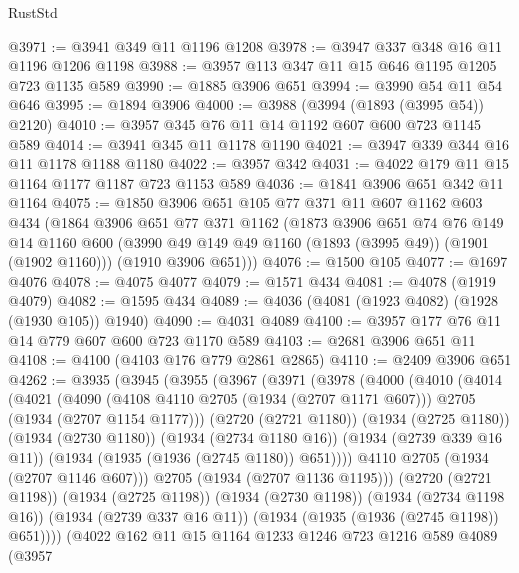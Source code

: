 \begin{lexlean}{RustStd}
\begin{coremodule}
@3971 := @3941 @349 @11 @1196 @1208
@3978 := @3947 @337 @348 @16 @11 @1196 @1206 @1198
@3988 := @3957 @113 @347 @11 @15 @646 @1195 @1205 @723 @1135 @589
@3990 := @1885 @3906 @651
@3994 := @3990 @54 @11 @54 @646
@3995 := @1894 @3906
@4000 := @3988 (@3994 (@1893 (@3995 @54)) @2120)
@4010 := @3957 @345 @76 @11 @14 @1192 @607 @600 @723 @1145 @589
@4014 := @3941 @345 @11 @1178 @1190
@4021 := @3947 @339 @344 @16 @11 @1178 @1188 @1180
@4022 := @3957 @342
@4031 := @4022 @179 @11 @15 @1164 @1177 @1187 @723 @1153 @589
@4036 := @1841 @3906 @651 @342 @11 @1164
@4075 := @1850
    @3906
    @651
    @105
    @77
    @371
    @11
    @607
    @1162
    @603
    @434
    (@1864
      @3906
      @651
      @77
      @371
      @1162
      (@1873
        @3906
        @651
        @74
        @76
        @149
        @14
        @1160
        @600
        (@3990 @49 @149 @49 @1160 (@1893 (@3995 @49)) (@1901 (@1902 @1160)))
        (@1910 @3906 @651)))
@4076 := @1500 @105
@4077 := @1697 @4076
@4078 := @4075 @4077
@4079 := @1571 @434
@4081 := @4078 (@1919 @4079)
@4082 := @1595 @434
@4089 := @4036 (@4081 (@1923 @4082) (@1928 (@1930 @105)) @1940)
@4090 := @4031 @4089
@4100 := @3957 @177 @76 @11 @14 @779 @607 @600 @723 @1170 @589
@4103 := @2681 @3906 @651 @11
@4108 := @4100 (@4103 @176 @779 @2861 @2865)
@4110 := @2409 @3906 @651
@4262 := @3935
    (@3945
      (@3955
        (@3967
          (@3971
            (@3978
              (@4000
                (@4010
                  (@4014
                    (@4021
                      (@4090
                        (@4108 @4110 @2705 (@1934 (@2707 @1171 @607)))
                        @2705
                        (@1934 (@2707 @1154 @1177)))
                      (@2720 (@2721 @1180))
                      (@1934 (@2725 @1180))
                      (@1934 (@2730 @1180))
                      (@1934 (@2734 @1180 @16))
                      (@1934 (@2739 @339 @16 @11))
                      (@1934 (@1935 (@1936 (@2745 @1180)) @651))))
                  @4110
                  @2705
                  (@1934 (@2707 @1146 @607)))
                @2705
                (@1934 (@2707 @1136 @1195)))
              (@2720 (@2721 @1198))
              (@1934 (@2725 @1198))
              (@1934 (@2730 @1198))
              (@1934 (@2734 @1198 @16))
              (@1934 (@2739 @337 @16 @11))
              (@1934 (@1935 (@1936 (@2745 @1198)) @651))))
          (@4022
            @162
            @11
            @15
            @1164
            @1233
            @1246
            @723
            @1216
            @589
            @4089
            (@3957

\end{coremodule}
\end{lexlean}
